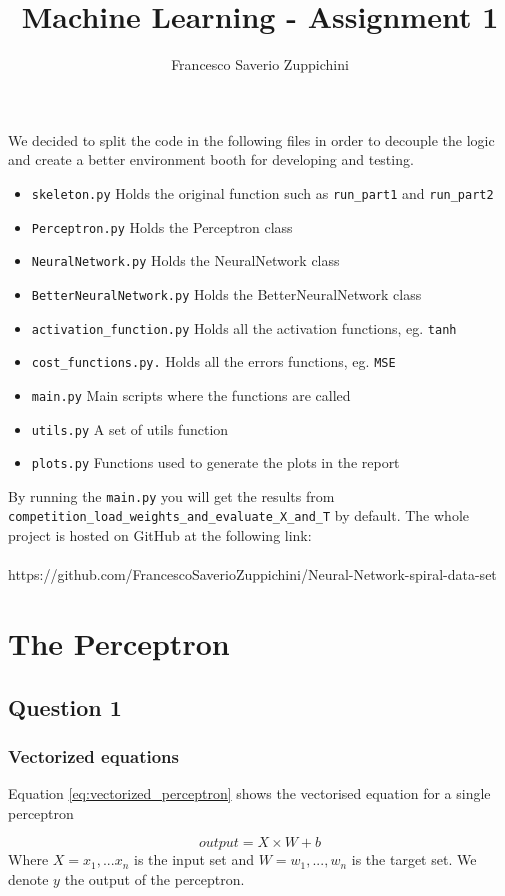 \documentclass[11pt]{article}
\author{Francesco Saverio Zuppichini}
\title{Machine Learning - Assignment 1}
\begin{document}
\maketitle

We decided to split the code in the following files in order to decouple the logic and create a better environment booth for developing and testing.
\begin{itemize}
	\item \texttt{skeleton.py} Holds the original function such as \texttt{run\_part1} and \texttt{run\_part2}
	\item \texttt{Perceptron.py} Holds the Perceptron class
	\item \texttt{NeuralNetwork.py} Holds the NeuralNetwork class
	\item \texttt{BetterNeuralNetwork.py} Holds the BetterNeuralNetwork class
	\item \texttt{activation\_function.py} Holds all the activation functions, eg. \texttt{tanh}
	\item \texttt{cost\_functions.py.} Holds all the errors functions, eg. \texttt{MSE}
	\item \texttt{main.py} Main scripts where the functions are called
	\item \texttt{utils.py} A set of utils function 
	\item \texttt{plots.py} Functions used to generate the plots in the report
\end{itemize}
By running the \texttt{main.py} you will get the results from \texttt{competition\_load\_weights\_and\_evaluate\_X\_and\_T} by default. The whole project is hosted on GitHub at the following link:
\\
\\
https://github.com/FrancescoSaverioZuppichini/Neural-Network-spiral-data-set
\section{The Perceptron}
\subsection{Question 1}
\subsubsection{Vectorized equations}
Equation \ref{eq:vectorized_perceptron} shows the vectorised equation for a single perceptron

\begin{equation}
\label{eq:vectorized_perceptron}
output = X\times W + b
\end{equation}
Where $X = {x_1, ... x_n}$ is the input set and $W = {w_1, ..., w_n}$ is the target set. We denote $y$ the output of the perceptron.
\end{document}
